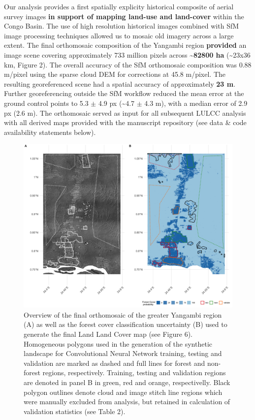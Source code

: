 \documentclass[remote sensing,article,submit,moreauthors,pdftex]{mdpi}
\begin{document}
Our analysis provides a first spatially explicity historical composite
of aerial survey images \textbf{in support of mapping land-use and
land-cover} within the Congo Basin. The use of high resolution
historical images combined with SfM image processing techniques allowed
us to mosaic old imagery across a large extent. The final orthomosaic
composition of the Yangambi region \textbf{provided} an image scene
covering approximately 733 million pixels across
\textbf{\textasciitilde{}82800 ha} (\textasciitilde{}23x36 km, Figure
2). The overall accuracy of the SfM orthomosaic composition was 0.88
m/pixel using the sparse cloud DEM for corrections at 45.8 m/pixel. The
resulting georeferenced scene had a spatial accuracy of approximately
\textbf{23 m}. Further georeferencing outside the SfM workflow reduced
the mean error at the ground control points to 5.3 \(\pm\) 4.9 px
(\textasciitilde{}4.7 \(\pm\) 4.3 m), with a median error of 2.9 px (2.6
m). The orthomosaic served as input for all subsequent LULCC analysis
with all derived maps provided with the manuscript repository (see data
\& code availability statements below).

\begin{figure}

{\centering \includegraphics[width=1\linewidth]{./figures/orthomosaic_maps} 

}

\caption{Overview of the final orthomosaic of the greater Yangambi region (A) as well as the forest cover classification uncertainty (B) used to generate the final Land Land Cover map (see Figure 6). Homogeneous polygons used in the generation of the synthetic landscape for Convolutional Neural Network training, testing and validation are marked as dashed and full lines for forest and non-forest regions, respectively. Training, testing and validation regions are denoted in panel B in green, red and orange, respectivelly. Black polygon outlines denote cloud and image stitch line regions which were manually excluded from analysis, but retained in calculation of validation statistics (see Table 2).}\label{fig:unnamed-chunk-6}
\end{figure}
\end{document}
